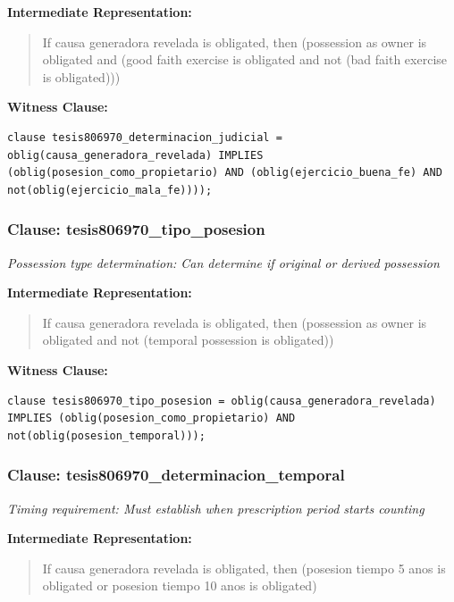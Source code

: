 \documentclass[11pt,a4paper]{article}
\begin{document}
\textbf{Intermediate Representation:}

\begin{quote}
If causa generadora revelada is obligated, then (possession as owner is obligated and (good faith exercise is obligated and not (bad faith exercise is obligated)))
\end{quote}

\textbf{Witness Clause:}

\begin{lstlisting}[style=witnessstyle, language=Witness]
clause tesis806970_determinacion_judicial = oblig(causa_generadora_revelada) IMPLIES (oblig(posesion_como_propietario) AND (oblig(ejercicio_buena_fe) AND not(oblig(ejercicio_mala_fe))));
\end{lstlisting}

\subsubsection{Clause: tesis806970\_tipo\_posesion}

\textit{Possession type determination: Can determine if original or derived possession}

\textbf{Intermediate Representation:}

\begin{quote}
If causa generadora revelada is obligated, then (possession as owner is obligated and not (temporal possession is obligated))
\end{quote}

\textbf{Witness Clause:}

\begin{lstlisting}[style=witnessstyle, language=Witness]
clause tesis806970_tipo_posesion = oblig(causa_generadora_revelada) IMPLIES (oblig(posesion_como_propietario) AND not(oblig(posesion_temporal)));
\end{lstlisting}

\subsubsection{Clause: tesis806970\_determinacion\_temporal}

\textit{Timing requirement: Must establish when prescription period starts counting}

\textbf{Intermediate Representation:}

\begin{quote}
If causa generadora revelada is obligated, then (posesion tiempo 5 anos is obligated or posesion tiempo 10 anos is obligated)
\end{quote}
\end{document}
